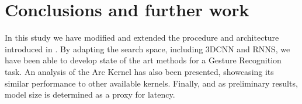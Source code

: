 \documentclass[10pt, a4paper, twocolumn]{article}
\begin{document}
\section{Conclusions and further work}

In this study we have modified and extended the procedure and architecture introduced in \cite{Fedorov2019}. By adapting the search space, including 3DCNN and RNNS, we have been able to develop state of the art methods for a Gesture Recognition task. An analysis of the Arc Kernel \cite{Swersky2014} has also been presented, showcasing its similar performance to other available kernels. Finally, and as preliminary results, model size is determined as a proxy for latency. 


\end{document}
